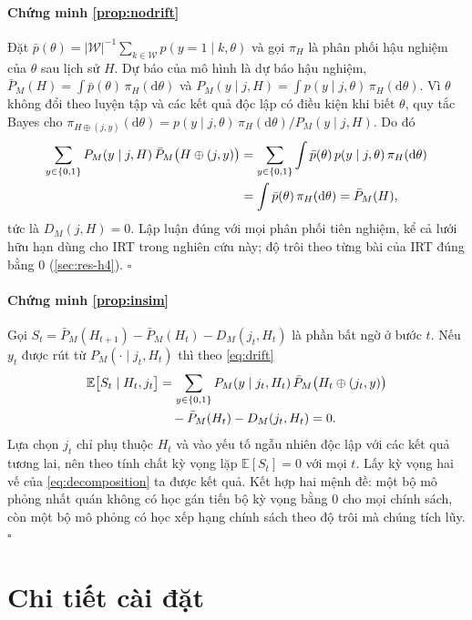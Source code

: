 \documentclass[a4paper,preprint,12pt,authoryear]{elsarticle}
\begin{document}
\paragraph{Chứng minh \cref{prop:nodrift}} Đặt $\bar p(\theta)=|\mathcal W|^{-1}\sum_{k\in\mathcal W}p(y=1\mid k,\theta)$ và gọi $\pi_H$ là phân phối hậu nghiệm của $\theta$ sau lịch sử $H$. Dự báo của mô hình là dự báo hậu nghiệm, $\bar P_M(H)=\int\bar p(\theta)\,\pi_H(\mathrm d\theta)$ và $P_M(y\mid j,H)=\int p(y\mid j,\theta)\,\pi_H(\mathrm d\theta)$. Vì $\theta$ không đổi theo luyện tập và các kết quả độc lập có điều kiện khi biết $\theta$, quy tắc Bayes cho $\pi_{H\oplus(j,y)}(\mathrm d\theta)=p(y\mid j,\theta)\,\pi_H(\mathrm d\theta)/P_M(y\mid j,H)$. Do đó
\begin{align}
\sum_{y\in\{0,1\}}P_M(y\mid j,H)\,\bar P_M\bigl(H\oplus(j,y)\bigr)
&=\sum_{y\in\{0,1\}}\int\bar p(\theta)\,p(y\mid j,\theta)\,\pi_H(\mathrm d\theta)\notag\\
&=\int\bar p(\theta)\,\pi_H(\mathrm d\theta)=\bar P_M(H),
\end{align}
tức là $D_M(j,H)=0$. Lập luận đúng với mọi phân phối tiên nghiệm, kể cả lưới hữu hạn dùng cho IRT trong nghiên cứu này; độ trôi theo từng bài của IRT đúng bằng 0 (\cref{sec:res-h4}). $\square$

\paragraph{Chứng minh \cref{prop:insim}} Gọi $S_t=\bar P_M(H_{t+1})-\bar P_M(H_t)-D_M(j_t,H_t)$ là phần bất ngờ ở bước $t$. Nếu $y_t$ được rút từ $P_M(\cdot\mid j_t,H_t)$ thì theo \eqref{eq:drift}
\begin{align}
\mathbb E\bigl[S_t\mid H_t,j_t\bigr]
&=\sum_{y\in\{0,1\}}P_M(y\mid j_t,H_t)\,\bar P_M\bigl(H_t\oplus(j_t,y)\bigr)\notag\\
&\quad-\bar P_M(H_t)-D_M(j_t,H_t)=0.
\end{align}
Lựa chọn $j_t$ chỉ phụ thuộc $H_t$ và vào yếu tố ngẫu nhiên độc lập với các kết quả tương lai, nên theo tính chất kỳ vọng lặp $\mathbb E[S_t]=0$ với mọi $t$. Lấy kỳ vọng hai vế của \eqref{eq:decomposition} ta được kết quả. Kết hợp hai mệnh đề: một bộ mô phỏng nhất quán không có học gán tiến bộ kỳ vọng bằng 0 cho mọi chính sách, còn một bộ mô phỏng có học xếp hạng chính sách theo độ trôi mà chúng tích lũy. $\square$

\section{Chi tiết cài đặt}\label{app:impl}
\end{document}
